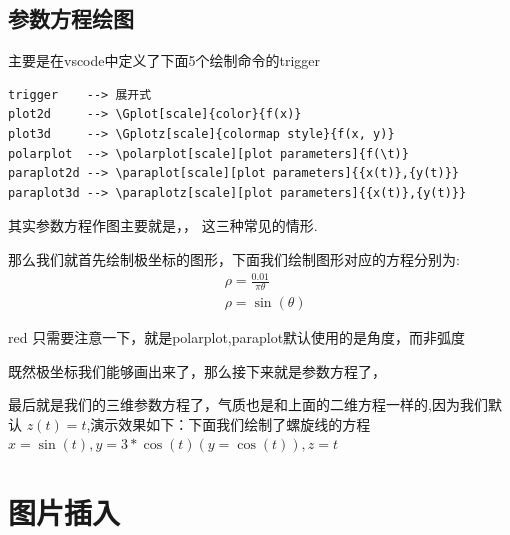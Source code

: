 \documentclass[12pt]{article}
\begin{document}
\subsection{参数方程绘图}
主要是在vscode中定义了下面5个绘制命令的trigger
\begin{lstlisting}
trigger    --> 展开式
plot2d     --> \Gplot[scale]{color}{f(x)}
plot3d     --> \Gplotz[scale]{colormap style}{f(x, y)}
polarplot  --> \polarplot[scale][plot parameters]{f(\t)}
paraplot2d --> \paraplot[scale][plot parameters]{{x(t)},{y(t)}}
paraplot3d --> \paraplotz[scale][plot parameters]{{x(t)},{y(t)}}
\end{lstlisting}

其实参数方程作图主要就是，，
这三种常见的情形.


那么我们就首先绘制极坐标的图形，下面我们绘制图形对应的方程分别为:
\begin{align}
    & \rho = \frac{0.01}{\pi \theta}\\
    & \rho = \sin(\theta)
\end{align}

\begin{formal}{red}
    只需要注意一下，就是polarplot,paraplot默认使用的是角度，而非弧度
\end{formal}

\begin{center}
\end{center}


既然极坐标我们能够画出来了，那么接下来就是参数方程了，
\begin{center}
\end{center}

最后就是我们的三维参数方程了，气质也是和上面的二维方程一样的,因为我们默认
$z(t) = t$,演示效果如下：下面我们绘制了螺旋线的方程 $x=\sin(t),y=3*\cos(t)(y=\cos(t)),z=t$
\begin{center}
\end{center}



\section{图片插入}
\end{document}
